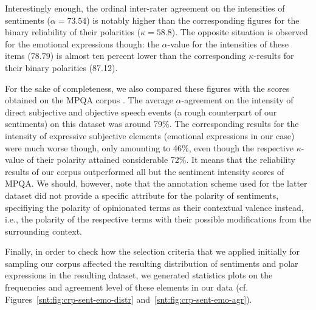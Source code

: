 Interestingly enough, the ordinal inter-rater agreement on the
intensities of sentiments ($\alpha = 73.54$) is notably higher than
the corresponding figures for the binary reliability of their
polarities ($\kappa = 58.8$).  The opposite situation is observed for
the emotional expressions though: the $\alpha$-value for the
intensities of these items ($78.79$) is almost ten percent lower than
the corresponding $\kappa$-results for their binary polarities
(87.12).

For the sake of completeness, we also compared these figures with the
scores obtained on the MPQA corpus \cite[cf.][pp. 38, 80]{Wilson:07}.
The average $\alpha$-agreement on the intensity of direct subjective
and objective speech events (a rough counterpart of our sentiments) on
this dataset was around 79\%.  The corresponding results for the
intensity of expressive subjective elements (emotional expressions in
our case) were much worse though, only amounting to 46\%, even though
the respective $\kappa$-value of their polarity attained considerable
72\%.  It means that the reliability results of our corpus
outperformed all but the sentiment intensity scores of MPQA.  We
should, however, note that the annotation scheme used for the latter
dataset did not provide a specific attribute for the polarity of
sentiments, specifiying the polarity of opinionated terms as their
contextual valence instead, i.e., the polarity of the respective terms
with their possible modifications from the surrounding context.

Finally, in order to check how the selection criteria that we applied
initially for sampling our corpus affected the resulting distribution
of sentiments and polar expressions in the resulting dataset, we
generated statistics plots on the frequencies and agreement level of
these elements in our data
(cf. Figures~\ref{snt:fig:crp-sent-emo-distr}
and~\ref{snt:fig:crp-sent-emo-agr}).


